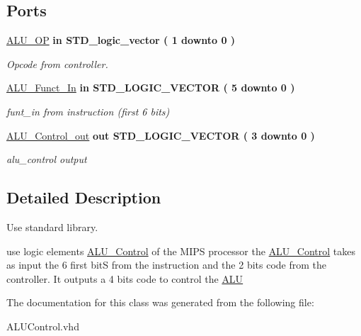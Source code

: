 \subsection*{\-Ports}
 \begin{DoxyCompactItemize}
\item 
\hypertarget{class_a_l_u___control_ab5e38318e201e0011dc9fe806b2c9ea4}{\hyperlink{class_a_l_u___control_ab5e38318e201e0011dc9fe806b2c9ea4}{\-A\-L\-U\-\_\-\-O\-P}  {\bfseries {\bfseries in }} {\bfseries \-S\-T\-D\-\_\-logic\-\_\-vector (   1    downto    0  ) } }\label{class_a_l_u___control_ab5e38318e201e0011dc9fe806b2c9ea4}

\begin{DoxyCompactList}\small\item\em \-Opcode from controller. \end{DoxyCompactList}\item 
\hypertarget{class_a_l_u___control_aa057cc5bea77eab736c8c526429fa204}{\hyperlink{class_a_l_u___control_aa057cc5bea77eab736c8c526429fa204}{\-A\-L\-U\-\_\-\-Funct\-\_\-\-In}  {\bfseries {\bfseries in }} {\bfseries \-S\-T\-D\-\_\-\-L\-O\-G\-I\-C\-\_\-\-V\-E\-C\-T\-O\-R (   5    downto    0  ) } }\label{class_a_l_u___control_aa057cc5bea77eab736c8c526429fa204}

\begin{DoxyCompactList}\small\item\em funt\-\_\-in from instruction (first 6 bits) \end{DoxyCompactList}\item 
\hypertarget{class_a_l_u___control_a770899168989eb2b8a2d815fbd0a3a17}{\hyperlink{class_a_l_u___control_a770899168989eb2b8a2d815fbd0a3a17}{\-A\-L\-U\-\_\-\-Control\-\_\-out}  {\bfseries {\bfseries out }} {\bfseries \-S\-T\-D\-\_\-\-L\-O\-G\-I\-C\-\_\-\-V\-E\-C\-T\-O\-R (   3    downto    0  ) } }\label{class_a_l_u___control_a770899168989eb2b8a2d815fbd0a3a17}

\begin{DoxyCompactList}\small\item\em alu\-\_\-control output \end{DoxyCompactList}\end{DoxyCompactItemize}


\subsection{\-Detailed \-Description}
\-Use standard library. 

use logic elements \hyperlink{class_a_l_u___control}{\-A\-L\-U\-\_\-\-Control} of the \-M\-I\-P\-S processor the \hyperlink{class_a_l_u___control}{\-A\-L\-U\-\_\-\-Control} takes as input the 6 first bit\-S from the instruction and the 2 bits code from the controller. \-It outputs a 4 bits code to control the \hyperlink{class_a_l_u}{\-A\-L\-U} 

\-The documentation for this class was generated from the following file\-:\begin{DoxyCompactItemize}
\item 
\-A\-L\-U\-Control.\-vhd\end{DoxyCompactItemize}
